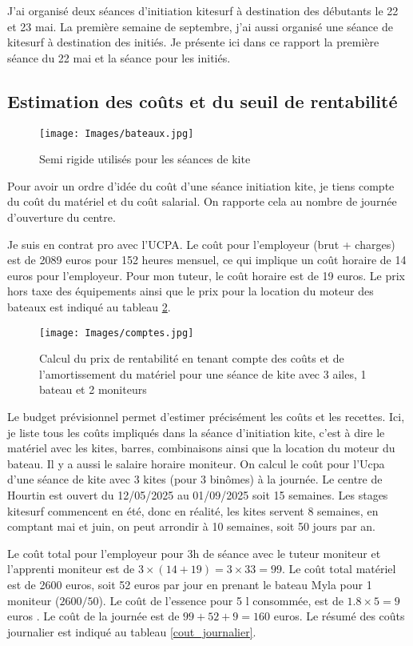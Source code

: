 \documentclass[11pt,a4paper]{report}
\begin{document}
J'ai organisé deux séances d'initiation kitesurf à destination des
débutants le 22 et 23 mai. La première semaine de septembre, j'ai 
aussi organisé une séance de kitesurf à destination des initiés.
Je présente ici dans ce rapport la première séance du 22 mai et la
séance pour les initiés.

\subsection{Estimation des co\^uts et du seuil de rentabilité}

\begin{figure}
\centering
\texttt{[image: Images/bateaux.jpg]} 
\caption{Semi rigide utilisés pour les séances de kite\label{bateaux}}
\end{figure}
Pour avoir un ordre d'idée du coût d'une séance initiation kite, je
tiens compte du co\^ut du matériel et du co\^ut salarial. On rapporte 
cela au nombre de journée d'ouverture du centre.

Je suis en contrat pro avec l'UCPA. Le coût pour l'employeur (brut + charges) est
de 2089 euros pour 152 heures mensuel, 
ce qui implique un coût horaire de 14 euros pour l'employeur.
Pour mon tuteur, le coût horaire est de 19 euros.
Le prix hors taxe des équipements ainsi
que le prix pour la location du moteur des bateaux est indiqué
au tableau \ref{couts}.

\begin{figure}
\texttt{[image: Images/comptes.jpg]} 
\caption{Calcul du prix de rentabilité en tenant compte
des co\^uts et de l'amortissement du matériel pour une séance de kite
avec 3 ailes, 1 bateau et 2 moniteurs\label{couts}}
\end{figure}

Le budget prévisionnel permet d'estimer précisément les co\^uts et les recettes.
Ici, je liste tous les coûts impliqués dans la séance d’initiation kite, 
c'est  à dire le matériel avec les kites, barres, combinaisons ainsi que
la location du moteur du bateau. Il y a aussi le salaire horaire moniteur. 
On calcul le coût pour l'Ucpa
d'une séance de kite avec 3 kites (pour 3 binômes) à la journée.
Le centre de Hourtin est ouvert du 12/05/2025 au 01/09/2025 soit 15 semaines. 
Les stages kitesurf commencent en été, donc en réalité, les kites servent
8 semaines, en comptant mai et juin, on peut arrondir à 10 semaines, soit 50 jours
par an.

Le coût total pour l'employeur pour 3h de séance avec le tuteur moniteur
et l'apprenti moniteur est de $3\times(14+19) = 3\times33 = 99 $.
Le coût total matériel est de 2600 euros, soit 52 euros par jour  en prenant
le bateau Myla pour 1 moniteur ($2600/50$).
Le coût de l'essence pour 5 l consommée, est de $1.8\times5 = 9$ euros .
Le coût de la journée est de $99 + 52 + 9 =  160 $ euros.
Le résumé des coûts journalier est indiqué au tableau \ref{cout_journalier}.
\end{document}
